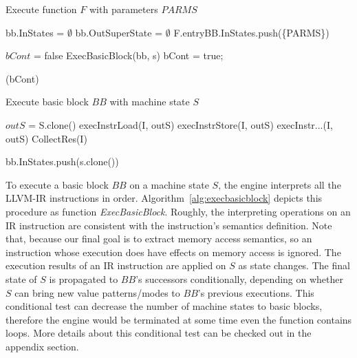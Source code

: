 \begin{algorithm}
  \caption{Execute function $F$ with parameters $PARMS$}
  \footnotesize
  \begin{algorithmic}[1]
     
    \State bb.InStates = {$\emptyset$} 
    \State bb.OutSuperState = {$\emptyset$} 
    \EndFor
    \State F.entryBB.InStates.push(\{PARMS\}) 
    \State

    \Do {}

    \State $bCont$ = false
    \State ExecBasicBlock(bb, s)
    \State bCont = true;
    \EndWhile
    \EndFor

    \doWhile(bCont)
    \EndFunction
  \end{algorithmic}
  \label{alg:execfunction}
\end{algorithm}


\begin{algorithm}
  \caption{Execute basic block $BB$ with machine state $S$}
  \footnotesize
  \begin{algorithmic}[1]
    \State $outS$ = S.clone()  
    \State execInstrLoad(I, outS) 
    \EndCase
    \State execInstrStore(I, outS)
    \EndCase
    \State execInstr...(I, outS)
    \EndCase
    \EndSwitch
    \State CollectRes(I) 
    \EndFor

    \State
     
     
    \State bb.InStates.push(s.clone())
    \EndFor
    \EndIf

    \EndFunction
  \end{algorithmic}
  \label{alg:execbasicblock}
\end{algorithm}

To execute a basic block $BB$ on a machine state $S$, the engine interprets all the LLVM-IR instructions in order.
Algorithm~\ref{alg:execbasicblock} depicts this procedure as function \textit{ExecBasicBlock}.
Roughly, the interpreting operations on an IR instruction are consistent with the instruction's semantics definition.
Note that, because our final goal is to extract memory access semantics,
so an instruction whose execution does have effects on memory access is ignored.
The execution results of an IR instruction are applied on $S$ as state changes.
The final state of $S$ is propagated to $BB$'s successors conditionally,
depending on whether $S$ can bring new value patterns/modes to $BB$'s previous executions.
This conditional test can decrease the number of machine states to basic blocks,
therefore the engine would be terminated at some time even the function contains loops.
More details about this conditional test can be checked out in the appendix section.



